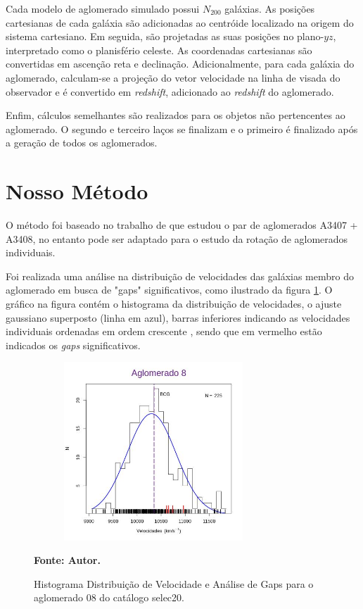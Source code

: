 Cada modelo de aglomerado simulado possui $N_{200}$ galáxias. As posições cartesianas de cada galáxia são adicionadas ao centróide localizado na origem do sistema cartesiano. Em seguida, são projetadas as suas posições no plano-$yz$, interpretado como o planisfério celeste. As coordenadas cartesianas são convertidas em ascenção reta e declinação. Adicionalmente, para cada galáxia do aglomerado, calculam-se a projeção do vetor velocidade na linha de visada do observador e é convertido em \textit{redshift}, adicionado ao \textit{redshift} do aglomerado. 

Enfim, cálculos semelhantes são realizados para os objetos não pertencentes ao aglomerado. O segundo e terceiro laços se finalizam e o primeiro é finalizado após a geração de todos os aglomerados.


\section{Nosso Método}
O método foi baseado no trabalho de  que estudou o par de aglomerados A3407 + A3408, no entanto pode ser adaptado para o estudo da rotação de aglomerados individuais. 

Foi realizada uma análise na distribuição de velocidades das galáxias membro do aglomerado em busca de "gaps" significativos, como ilustrado da figura \ref{fig:selec20gap}. O gráfico na figura contém o histograma da distribuição de velocidades, o ajuste gaussiano superposto (linha em azul), barras inferiores indicando as velocidades individuais ordenadas em ordem crescente , sendo que em vermelho estão indicados os \textit{gaps} significativos.

\begin{figure}[H] %
\vspace{-2pt}
\begin{center}
\includegraphics[height=6.7cm,width=9cm]{04-figuras/selec20gap}%
\caption{Histograma Distribuição de Velocidade e Análise de Gaps para o aglomerado 08 do catálogo selec20.}
\textbf{Fonte: Autor.}
\label{fig:selec20gap}%
\end{center}
\end{figure}

